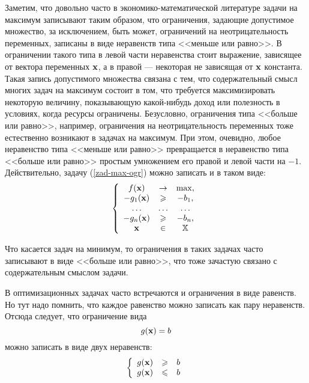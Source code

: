     Заметим, что довольно часто в экономико-математической
    литературе задачи на максимум записывают таким образом, что
    ограничения, задающие допустимое
    множество, за исключением, быть может, ограничений на неотрицательность переменных,
     записаны в виде неравенств типа <<меньше или равно>>. В
     ограничении такого типа в левой части неравенства стоит выражение, зависящее от
    вектора переменных
    $\mathbf{x}$, а в правой --- некоторая не зависящая от $\mathbf{x}$
    константа. Такая запись допустимого множества связана с тем,
    что содержательный смысл многих
    задач на максимум состоит в том, что требуется максимизировать
    некоторую величину, показывающую какой-нибудь доход или
    полезность в условиях, когда ресурсы ограничены. Безусловно,
    ограничения типа <<больше или равно>>, например, ограничения на
    неотрицательность переменных тоже естественно возникают в задачах на максимум.
    При этом, очевидно, любое неравенство типа <<меньше или равно>>
    превращается в неравенство типа <<больше или равно>> простым
    умножением его правой и левой части на $-1$. Действительно,
    задачу (\ref{zad-max-ogr}) можно записать и в таком виде:
\begin{equation*}
    \left\{
    \begin{array}{ccc}
      f(\mathbf{x}) & \rightarrow & \max, \\
      -g_{1}(\mathbf{x})& \geqslant & -b_{1}, \\
      \ldots & \ldots & \ldots \\
      -g_{n}(\mathbf{x})& \geqslant & -b_{n},\\
      \mathbf{x} & \in & \mathbb{X}\\
    \end{array}
    \right.
\end{equation*}

Что касается задач на минимум, то ограничения в таких задачах часто
записывают в виде <<больше или равно>>, что тоже зачастую связано с
содержательным смыслом задачи.

    В оптимизационных задачах часто встречаются и ограничения в виде
    равенств. Но тут надо помнить, что каждое равенство можно
    записать как пару неравенств. Отсюда следует, что ограничение
    вида
    \[g(\mathbf{x})=b\]
    можно записать в виде двух неравенств:
    \[\left\{\begin{array}{ccc}
        g(\mathbf{x}) & \geqslant & b \\
        g(\mathbf{x}) & \leqslant & b
      \end{array}
    \right.\]


